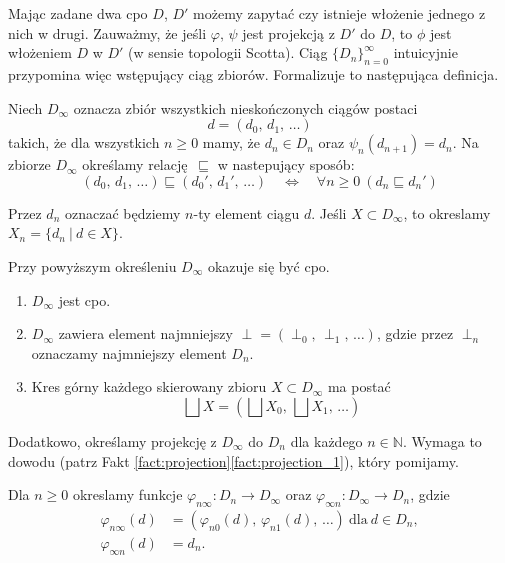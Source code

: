 Mając zadane dwa cpo \(D\), \(D'\) możemy zapytać czy istnieje włożenie jednego z nich w drugi. Zauważmy, że jeśli \(\varphi,\,\psi\) jest projekcją z \(D'\) do \(D\), to \(\phi\) jest włożeniem \(D\) w \(D'\) (w sensie topologii Scotta). Ciąg \(\{D_n\}_{n=0}^\infty\) intuicyjnie przypomina więc wstępujący ciąg zbiorów. Formalizuje to następująca definicja.


\begin{definicja}%
Niech \(D_\infty\) oznacza zbiór wszystkich nieskończonych ciągów postaci
\[
d=(d_0,\,d_1,\,\dots)
\]
takich, że dla wszystkich \(n\geq 0\) mamy, że \(d_n\in D_n\) oraz \(\psi_n (d_{n+1}) = d_n\). 
Na zbiorze \(D_\infty\) określamy relację \(\sqsubseteq\) w nastepujący sposób:
\[
(d_0,\,d_1,\,\dots) \sqsubseteq (d_0',\,d_1',\,\dots) \quad \Leftrightarrow\quad  \forall n\geq 0\  (d_n\sqsubseteq d_n') 
\]

  Przez \(d_n\) oznaczać będziemy \(n\)-ty element ciągu \(d\). Jeśli \(X\subset D_\infty\), to okreslamy \(X_n=\{ d_n\ |\ d\in X\}\).

\end{definicja}

Przy powyższym określeniu \(D_\infty\) okazuje się być cpo.

\begin{fakt}%
\begin{enumerate}[label={(\roman*)}, ref={(\roman*)}] 
  \setlength\itemsep{0em}
\item \(D_\infty\) jest cpo.
\item \(D_\infty\) zawiera element najmniejszy \(\perp=(\perp_0,\,\perp_1,\,\dots)\), gdzie przez \(\perp_n\) oznaczamy najmniejszy element \(D_n\).
\item Kres górny każdego skierowany zbioru \(X\subset D_\infty\) ma postać
\[
\bigsqcup X = (\bigsqcup X_0,\,\bigsqcup X_1,\,\dots)
\]
\end{enumerate}
\end{fakt}

Dodatkowo, określamy projekcję z \(D_\infty\) do \(D_n\) dla każdego \(n\in\mathbb{N}\).
Wymaga to dowodu (patrz Fakt \ref{fact:projection}\ref{fact:projection_1}), który pomijamy.

\begin{definicja}[\(D_\infty\)]%
Dla \(n\geq 0\) okreslamy funkcje \(\varphi_{n\infty}:D_n\to D_\infty\) oraz \(\varphi_{\infty n}: D_\infty \to D_n\), gdzie 
\begin{align*}
\varphi_{n\infty}(d) &= (\varphi_{n0}(d),\,\varphi_{n1}(d),\,\dots)\ \text{dla}\ d\in D_n,\\
\varphi_{\infty n}(d) &= d_n.
\end{align*}
\end{definicja}

